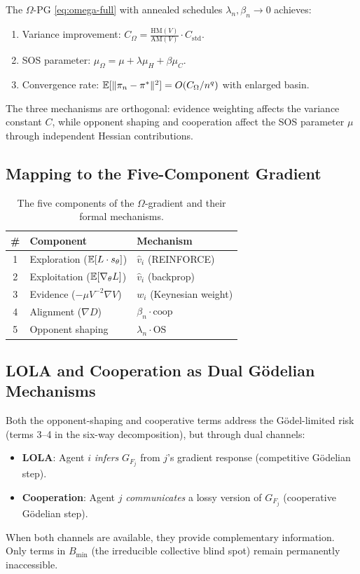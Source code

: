 \begin{theorem}\label{thm:omega-full}
The $\Omega$-PG \eqref{eq:omega-full} with annealed schedules $\lambda_n, \beta_n \to 0$ achieves:
\begin{enumerate}
    \item Variance improvement: $C_\Omega = \frac{\mathrm{HM}(V)}{\mathrm{AM}(V)} \cdot C_{\text{std}}$.
    \item SOS parameter: $\mu_\Omega = \mu + \lambda\mu_H + \beta\mu_C$.
    \item Convergence rate: $\mathbb{E}[\|\pi_n - \pi^*\|^2] = O(C_\Omega / n^q)$ with enlarged basin.
\end{enumerate}
\end{theorem}

The three mechanisms are orthogonal: evidence weighting affects the variance constant $C$, while opponent shaping and cooperation affect the SOS parameter $\mu$ through independent Hessian contributions.

\subsection{Mapping to the Five-Component Gradient}

\begin{table}[h]
\centering
\begin{tabular}{cll}
\toprule
\# & Component & Mechanism \\
\midrule
1 & Exploration ($\mathbb{E}[L \cdot s_\theta]$) & $\hat{v}_i$ (REINFORCE) \\
2 & Exploitation ($\mathbb{E}[\nabla_\theta L]$) & $\hat{v}_i$ (backprop) \\
3 & Evidence ($-\mu V^{-2}\nabla V$) & $w_i$ (Keynesian weight) \\
4 & Alignment ($\nabla D$) & $\beta_n \cdot \text{coop}$ \\
5 & Opponent shaping & $\lambda_n \cdot \text{OS}$ \\
\bottomrule
\end{tabular}
\caption{The five components of the $\Omega$-gradient and their formal mechanisms.}
\end{table}

\subsection{LOLA and Cooperation as Dual G\"odelian Mechanisms}

Both the opponent-shaping and cooperative terms address the G\"odel-limited risk (terms 3--4 in the six-way decomposition), but through dual channels:
\begin{itemize}
    \item \textbf{LOLA}: Agent $i$ \emph{infers} $G_{F_j}$ from $j$'s gradient response (competitive G\"odelian step).
    \item \textbf{Cooperation}: Agent $j$ \emph{communicates} a lossy version of $G_{F_j}$ (cooperative G\"odelian step).
\end{itemize}
When both channels are available, they provide complementary information. Only terms in $B_{\min}$ (the irreducible collective blind spot) remain permanently inaccessible.


